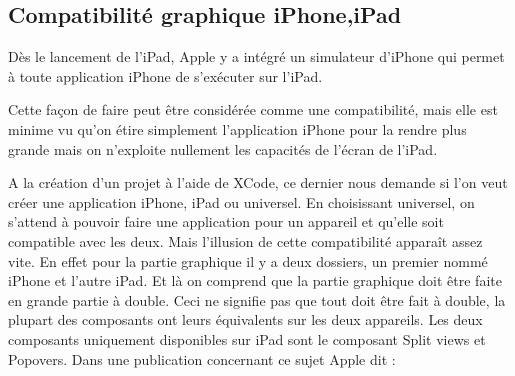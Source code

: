 	\subsection{Compatibilité graphique iPhone,iPad}
	Dès le lancement de l'iPad, Apple y a intégré un simulateur d'iPhone qui permet à toute application iPhone de s'exécuter sur l'iPad. 
			\begin{figure} [H]
				\centering 
			\end{figure}
	Cette façon de faire peut être considérée comme une compatibilité, mais elle est minime vu qu'on étire simplement l'application iPhone pour la rendre plus grande mais on n'exploite nullement les capacités de l'écran de l'iPad.
	
	A la création d'un projet à l'aide de XCode, ce dernier nous demande si l'on veut créer une application iPhone, iPad ou universel. En choisissant universel, on s'attend à pouvoir faire une application pour un appareil et qu'elle soit compatible avec les deux. Mais l'illusion de cette compatibilité apparaît assez vite. En effet pour la partie graphique il y a deux dossiers, un premier nommé iPhone et l'autre iPad. Et là on comprend que la partie graphique doit être faite en grande partie à double. Ceci ne signifie pas que tout doit être fait à double, la plupart des composants ont leurs équivalents sur les deux appareils. Les deux composants uniquement disponibles sur iPad sont le composant Split views et Popovers. 
	Dans une publication concernant\cite{appleComp} ce sujet  Apple  dit :\\
	
